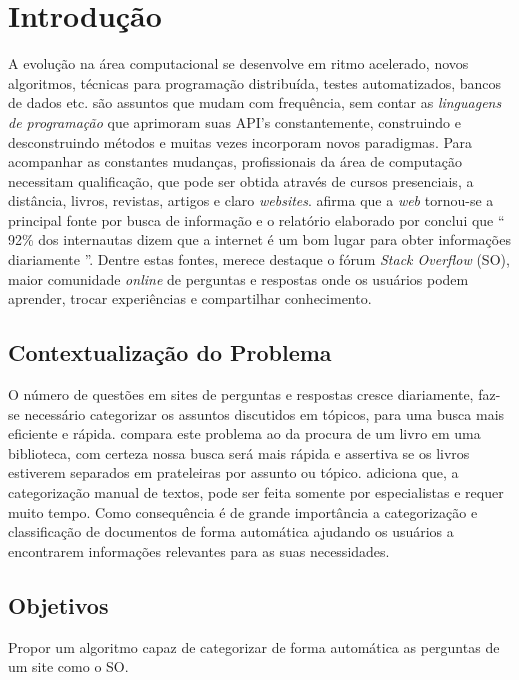 \documentclass[10pt,a4paper,final]{article}
\begin{document}
    \folhaDeRosto

    \plano
    
    \section{Introdução}
    
A evolução na área computacional se desenvolve em ritmo acelerado, novos algoritmos, técnicas para programação distribuída, testes automatizados, bancos de dados etc. são assuntos que mudam com frequência, sem contar as \emph{linguagens de programação} que aprimoram suas API's constantemente, construindo e desconstruindo métodos e muitas vezes incorporam novos paradigmas. Para acompanhar as constantes mudanças, profissionais da área de computação necessitam qualificação, que pode ser obtida através de cursos presenciais, a distância, livros, revistas, artigos e claro \textit{websites}. \cite{Manning2009} afirma que a \textit{web} tornou-se a principal fonte por busca de informação e o relatório elaborado por \cite{Fallows} conclui que \enquote{ 92\% dos internautas dizem que a internet é um bom lugar para obter informações diariamente }.
Dentre estas fontes, merece destaque o fórum \textit{Stack Overflow} (SO), maior comunidade \textit{online} de perguntas e respostas onde os usuários podem aprender, trocar experiências e compartilhar conhecimento.
    
    \subsection{Contextualização do Problema}
O número de questões em sites de perguntas e respostas cresce diariamente, faz-se necessário categorizar os assuntos discutidos em tópicos, para uma busca mais eficiente e rápida. \cite{Manning2009} compara este problema ao da procura de um livro em uma biblioteca, com certeza nossa busca será mais rápida e assertiva se os livros estiverem separados em prateleiras por assunto ou tópico. \cite{Yasotha2016} adiciona que, a categorização manual de textos, pode ser feita somente por especialistas e requer muito tempo. Como consequência é de grande importância a categorização e classificação de documentos de forma automática ajudando os usuários a encontrarem informações relevantes para as suas necessidades.

    \subsection{Objetivos}
Propor um algoritmo capaz de categorizar de forma automática as perguntas de um site como o SO.
\end{document}
